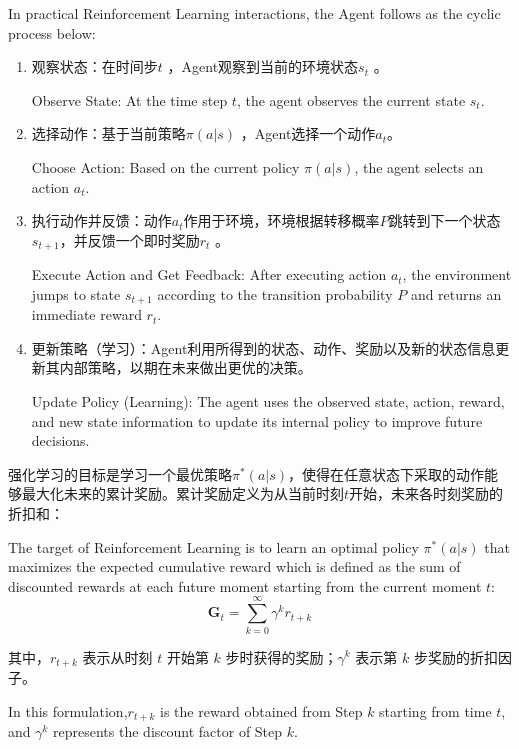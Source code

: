 In practical Reinforcement Learning interactions, the Agent follows as the cyclic process below:
\begin{enumerate} [label=\arabic*)] 
	
\item 观察状态：在时间步$t$ ，Agent观察到当前的环境状态$s_{t}$ 。

Observe State: At the time step $t$, the agent observes the current state $s_{t}$.
\item 选择动作：基于当前策略$\pi(a|s)$ ，Agent选择一个动作$a_{t}$。

Choose Action: Based on the current policy $\pi(a|s)$, the agent selects an action $a_{t}$.
\item 执行动作并反馈：动作$a_{t}$作用于环境，环境根据转移概率$P$跳转到下一个状态$s_{t+1}$，并反馈一个即时奖励$r_{t}$ 。

Execute Action and Get Feedback: After executing action $a_{t}$, the environment jumps to state $s_{t+1}$ according to the transition probability $P$ and returns an immediate reward $r_{t}$.
\item 更新策略（学习）：Agent利用所得到的状态、动作、奖励以及新的状态信息更新其内部策略，以期在未来做出更优的决策。

Update Policy (Learning): The agent uses the observed state, action, reward, and new state information to update its internal policy to improve future decisions.

\end{enumerate}

强化学习的目标是学习一个最优策略$\pi^{*}(a|s)$，使得在任意状态下采取的动作能够最大化未来的累计奖励。累计奖励定义为从当前时刻$t$开始，未来各时刻奖励的折扣和：

The target of Reinforcement Learning is to learn an optimal policy $\pi^{*}(a|s)$ that maximizes the expected cumulative reward which is defined as the sum of discounted rewards at each future moment starting from the current moment $t$:
\begin{equation}
	\label{eq:reward}
	\boldsymbol{G}_t = \sum_{k=0}^{\infty} \gamma^k r_{t+k}
\end{equation}

其中，\( r_{t+k} \) 表示从时刻 \( t \) 开始第 \( k \) 步时获得的奖励；\( \gamma^k \) 表示第 \( k \) 步奖励的折扣因子。

In this formulation,\( r_{t+k} \) is the reward obtained from Step \( k \) starting from time \( t \), and \( \gamma^k \) represents the discount factor of Step \( k \).

